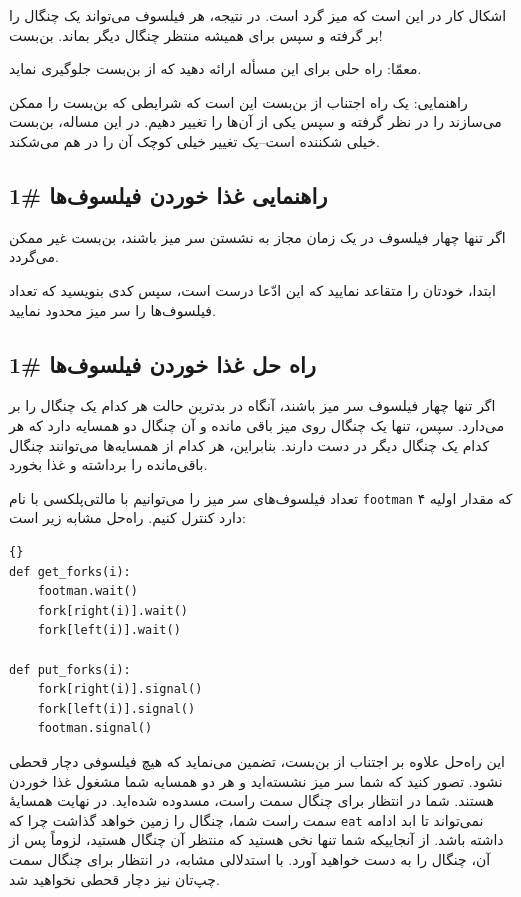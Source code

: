\documentclass{book}
\newcommand{\clearemptydoublepage}{\newpage\cleardoublepage}
\begin{document}
    اشکال کار در این است که میز گرد است. در نتیجه، هر فیلسوف می‌تواند یک چنگال را بر گرفته 
    و سپس برای همیشه منتظر چنگال دیگر بماند. بن‌بست! 

    معمّا: راه حلی برای این مسأله ارائه دهید که از بن‌بست جلوگیری نماید. 

    راهنمایی: یک راه اجتناب از بن‌بست این است که شرایطی که بن‌بست را ممکن می‌سازند را در نظر گرفته  و سپس یکی از آن‌ها را تغییر دهیم. 
    در این مساله، بن‌بست خیلی شکننده است--یک تغییر خیلی کوچک آن را در هم می‌شکند. 

\clearemptydoublepage
\subsection{راهنمایی غذا خوردن فیلسوف‌ها \#1}

    اگر تنها چهار فیلسوف در یک زمان مجاز به نشستن سر میز باشند، بن‌بست غیر ممکن می‌گردد. 

    ابتدا، خودتان را متقاعد نمایید که این ادّعا درست است، سپس کدی بنویسید که تعداد فیلسوف‌ها را سر میز محدود نمایید. 


\clearemptydoublepage
\subsection{راه حل غذا خوردن فیلسوف‌ها  \#1}

    اگر تنها چهار فیلسوف سر میز باشند، آنگاه در بدترین حالت هر کدام یک چنگال را بر می‌دارد. سپس، تنها یک چنگال روی میز باقی‌ مانده و 
    آن چنگال دو همسایه دارد که هر کدام یک چنگال دیگر در دست دارند. بنابراین، هر کدام از همسایه‌ها می‌توانند چنگال باقی‌مانده را برداشته و غذا بخورد. 

    تعداد فیلسوف‌های سر میز را می‌توانیم با مالتی‌پلکسی با نام {\tt footman} که مقدار اولیه ۴ دارد کنترل کنیم. 
    راه‌حل مشابه زیر است: 

\begin{latin}
\begin{lstlisting}[title=\rl{راه حل غذا خوردن فیلسوف‌ها \#1}]{}
def get_forks(i):
    footman.wait()
    fork[right(i)].wait()
    fork[left(i)].wait()

def put_forks(i):
    fork[right(i)].signal()
    fork[left(i)].signal()
    footman.signal()
\end{lstlisting}
\end{latin}

    این راه‌حل علاوه بر اجتناب از بن‌بست،  تضمین می‌نماید که هیچ فیلسوفی دچار قحطی نشود. 
    تصور کنید که شما سر میز نشسته‌اید و هر دو همسایه شما مشغول غذا خوردن هستند. 
    شما در انتظار برای چنگال سمت راست، مسدوده شده‌اید. در نهایت همسایهٔ سمت راست شما، 
    چنگال را زمین خواهد گذاشت چرا که  {\tt eat} 
    نمی‌تواند تا ابد ادامه داشته باشد. از آنجاییکه شما تنها نخی هستید که منتظر آن چنگال هستید، لزوماً پس از آن، 
    چنگال را به دست خواهید آورد. 
    با استدلالی مشابه، در انتظار برای چنگال سمت چپ‌تان نیز دچار قحطی نخواهید شد. 
    
\end{document}
